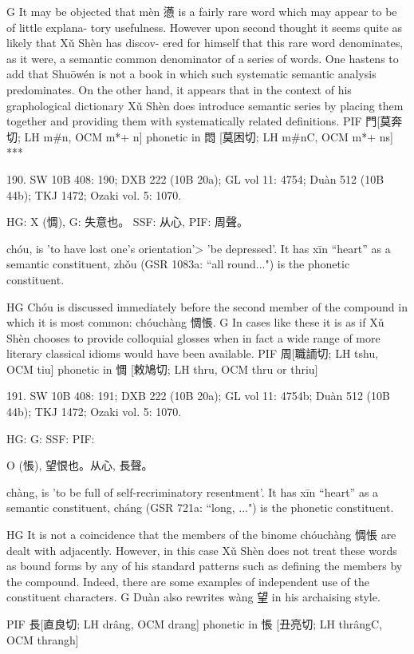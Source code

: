 G It may be objected that mèn 懣 is a fairly rare word which may appear to be of little explana- tory usefulness. However upon second thought it seems quite as likely that Xǔ Shèn has discov- ered for himself that this rare word denominates, as it were, a semantic common denominator of a series of words. One hastens to add that Shuōwén is not a book in which such systematic semantic analysis predominates. On the other hand, it appears that in the context of his graphological dictionary Xǔ Shèn does introduce semantic series by placing them together and providing them with systematically related definitions.
PIF     門[莫奔切; LH m\#n, OCM m*+ n] phonetic in 悶 [莫困切; LH m\#nC, OCM m*+ ns]
***

190. SW 10B 408: 190; DXB 222 (10B 20a); GL vol 11: 4754; Duàn 512 (10B 44b); TKJ 1472; Ozaki vol. 5: 1070.

HG: X (惆),
G:	失意也。
SSF: 从心,
PIF: 周聲。


chóu,
is 'to have lost one's orientation'> 'be depressed'. It has xīn ``heart'' as a semantic constituent,
zhǒu (GSR 1083a: ``all round...") is the phonetic constituent.

HG Chóu is discussed immediately before the second member of the compound in which it is most common: chóuchàng 惆悵.
G	In cases like these it is as if Xǔ Shèn chooses to provide colloquial glosses when in fact a wide range of more literary classical idioms would have been available.
PIF     周[職䛔切; LH tshu, OCM tiu] phonetic in 惆 [敕鳩切; LH thru, OCM thru or thriu]

191. SW 10B 408: 191; DXB 222 (10B 20a); GL vol 11: 4754b; Duàn 512 (10B 44b); TKJ 1472; Ozaki vol. 5: 1070.


HG:
G: SSF: PIF:

O (悵),
望恨也。从心,
長聲。


chàng,
is 'to be full of self-recriminatory resentment'. It has xīn ``heart'' as a semantic constituent,
cháng (GSR 721a: ``long, ...") is the phonetic constituent.

HG It is not a coincidence that the members of the binome chóuchàng 惆悵 are dealt with adjacently. However, in this case Xǔ Shèn does not treat these words as bound forms by any of his standard patterns such as defining the members by the compound. Indeed, there are some examples of independent use of the constituent characters.
G    Duàn also rewrites wàng 望 in his archaising style.



PIF     長[直良切; LH drâng, OCM drang] phonetic in 悵 [丑亮切; LH thrângC, OCM thrangh]

